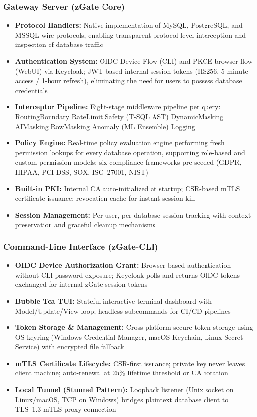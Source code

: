\subsubsection{Gateway Server (zGate Core)}
\begin{itemize}
    \item \textbf{Protocol Handlers:} Native implementation of MySQL, PostgreSQL, and MSSQL wire protocols, enabling transparent protocol-level interception and inspection of database traffic
    \item \textbf{Authentication System:} OIDC Device Flow (CLI) and PKCE browser flow (WebUI) via Keycloak; JWT-based internal session tokens (HS256, 5-minute access / 1-hour refresh), eliminating the need for users to possess database credentials
    \item \textbf{Interceptor Pipeline:} Eight-stage middleware pipeline per query: RoutingBoundary \textrightarrow{} RateLimit \textrightarrow{} Safety (T-SQL AST) \textrightarrow{} DynamicMasking \textrightarrow{} AIMasking \textrightarrow{} RowMasking \textrightarrow{} Anomaly (ML Ensemble) \textrightarrow{} Logging
    \item \textbf{Policy Engine:} Real-time policy evaluation engine performing fresh permission lookups for every database operation, supporting role-based and custom permission models; six compliance frameworks pre-seeded (GDPR, HIPAA, PCI-DSS, SOX, ISO~27001, NIST)
    \item \textbf{Built-in PKI:} Internal CA auto-initialized at startup; CSR-based mTLS certificate issuance; revocation cache for instant session kill
    \item \textbf{Session Management:} Per-user, per-database session tracking with context preservation and graceful cleanup mechanisms
\end{itemize}

\subsubsection{Command-Line Interface (zGate-CLI)}
\begin{itemize}
    \item \textbf{OIDC Device Authorization Grant:} Browser-based authentication without CLI password exposure; Keycloak polls and returns OIDC tokens exchanged for internal zGate session tokens
    \item \textbf{Bubble Tea TUI:} Stateful interactive terminal dashboard with Model/Update/View loop; headless subcommands for CI/CD pipelines
    \item \textbf{Token Storage \& Management:} Cross-platform secure token storage using OS keyring (Windows Credential Manager, macOS Keychain, Linux Secret Service) with encrypted file fallback
    \item \textbf{mTLS Certificate Lifecycle:} CSR-first issuance; private key never leaves client machine; auto-renewal at 25\% lifetime threshold or CA rotation
    \item \textbf{Local Tunnel (Stunnel Pattern):} Loopback listener (Unix socket on Linux/macOS, TCP on Windows) bridges plaintext database client to TLS~1.3 mTLS proxy connection
\end{itemize}

